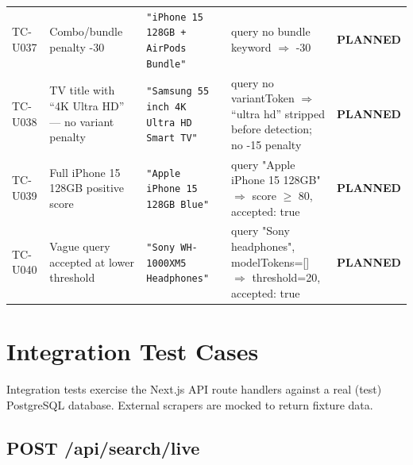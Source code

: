\documentclass[12pt,a4paper]{report}
\newcommand{\PEND}{\textcolor{pendyellow}{\textbf{PLANNED}}}
\begin{document}
\begin{longtable}{C{1.6cm} L{4cm} L{3.5cm} L{3.5cm} C{1.5cm}}
  TC-U037 &
    Combo/bundle penalty -30 &
    \texttt{"iPhone 15 128GB + AirPods Bundle"} &
    query no bundle keyword $\Rightarrow$ -30 &
    \PEND \\

  TC-U038 &
    TV title with ``4K Ultra HD'' --- no variant penalty &
    \texttt{"Samsung 55 inch 4K Ultra HD Smart TV"} &
    query no variantToken $\Rightarrow$ ``ultra hd'' stripped before
    detection; no -15 penalty &
    \PEND \\

  TC-U039 &
    Full iPhone 15 128GB positive score &
    \texttt{"Apple iPhone 15 128GB Blue"} &
    query "Apple iPhone 15 128GB" $\Rightarrow$
    score $\geq$ 80, accepted: true &
    \PEND \\

  TC-U040 &
    Vague query accepted at lower threshold &
    \texttt{"Sony WH-1000XM5 Headphones"} &
    query "Sony headphones", modelTokens=[] $\Rightarrow$
    threshold=20, accepted: true &
    \PEND \\

\end{longtable}

\chapter{Integration Test Cases}

Integration tests exercise the Next.js API route handlers against a real
(test) PostgreSQL database. External scrapers are mocked to return fixture data.

\section{POST /api/search/live}
\end{document}
